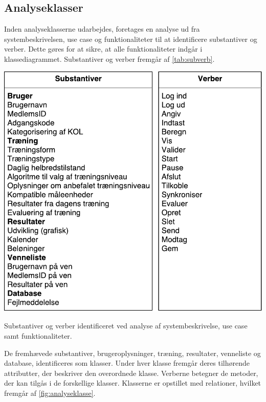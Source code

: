 \subsection*{Analyseklasser}
Inden analyseklasserne udarbejdes, foretages en analyse ud fra systembeskrivelsen, use case og funktionaliteter til at identificere substantiver og verber. Dette gøres for at sikre, at alle funktionaliteter indgår i klassediagrammet. Substantiver og verber fremgår af \autoref{tab:subverb}.

\begin{table}[H]
\centering
\includegraphics[width=1\textwidth]{figures/aktivitetsdiagram/substantiveverber}
\caption{Substantiver og verber identificeret ved analyse af systembeskrivelse, use case samt funktionaliteter.}
\label{tab:subverb}
\end{table}

\noindent
De fremhævede substantiver, brugeroplysninger, træning, resultater, venneliste og database, identificeres som klasser. Under hver klasse fremgår deres tilhørende attributter, der beskriver den overordnede klasse. Verberne betegner de metoder, der kan tilgås i de forskellige klasser. Klasserne er opstillet med relationer, hvilket fremgår af \autoref{fig:analyseklasse}.


